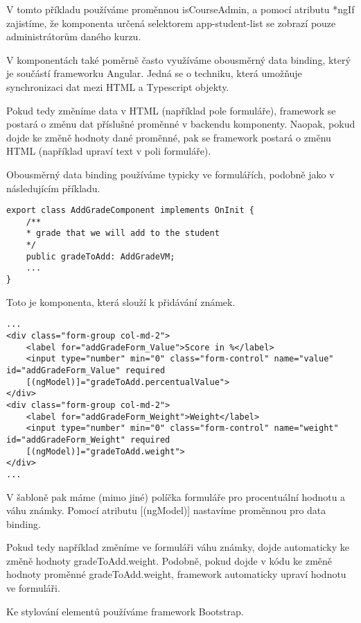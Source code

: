 V tomto příkladu používáme proměnnou isCourseAdmin, a pomocí atributu *ngIf zajistíme, že komponenta určená selektorem app-student-list se zobrazí pouze administrátorům daného kurzu. 

\vspace{\baselineskip}

V komponentách také poměrně často využíváme obousměrný data binding, který je součástí frameworku Angular. Jedná se o techniku, která umožňuje synchronizaci dat mezi HTML a Typescript objekty.

Pokud tedy změníme data v HTML (například pole formuláře), framework se postará o změnu dat příslušné proměnné v backendu komponenty. Naopak, pokud dojde ke změně hodnoty dané proměnné, pak se framework postará o změnu HTML (například upraví text v poli formuláře).

Obousměrný data binding používáme typicky ve formulářích, podobně jako v následujícím příkladu.

\lstset{style=typescript}
\begin{lstlisting}
export class AddGradeComponent implements OnInit {
	/**
	* grade that we will add to the student
	*/
	public gradeToAdd: AddGradeVM;
	...
}
\end{lstlisting}

Toto je komponenta, která slouží k přidávání známek. 

\lstset{style=html}
\begin{lstlisting}
...
<div class="form-group col-md-2">
	<label for="addGradeForm_Value">Score in %</label>
	<input type="number" min="0" class="form-control" name="value" id="addGradeForm_Value" required
	[(ngModel)]="gradeToAdd.percentualValue">
</div>
<div class="form-group col-md-2">
	<label for="addGradeForm_Weight">Weight</label>
	<input type="number" min="0" class="form-control" name="weight" id="addGradeForm_Weight" required
	[(ngModel)]="gradeToAdd.weight">
</div>
...
\end{lstlisting}

V šabloně pak máme (mimo jiné) políčka formuláře pro procentuální hodnotu a váhu známky.
Pomocí atributu [(ngModel)] nastavíme proměnnou pro data binding. 

Pokud tedy například změníme ve formuláři váhu známky, dojde automaticky ke změně hodnoty gradeToAdd.weight. Podobně, pokud dojde v kódu ke změně hodnoty proměnné gradeToAdd.weight, framework automaticky upraví hodnotu ve formuláři.

Ke stylování elementů používáme framework Bootstrap. 

